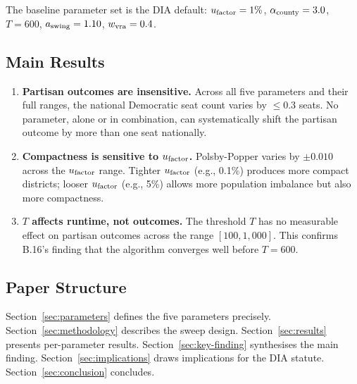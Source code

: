 The baseline parameter set is the DIA default: $u_{\mathrm{factor}} = 1\%$,
$\alpha_{\mathrm{county}} = 3.0$, $T = 600$, $a_{\mathrm{swing}} = 1.10$, $w_{\mathrm{vra}} = 0.4$.

\subsection{Main Results}

\begin{enumerate}
\item \textbf{Partisan outcomes are insensitive.}
      Across all five parameters and their full ranges, the national
      Democratic seat count varies by $\leq 0.3$ seats.
      No parameter, alone or in combination, can systematically shift the
      partisan outcome by more than one seat nationally.
\item \textbf{Compactness is sensitive to $u_{\mathrm{factor}}$.}
      Polsby-Popper varies by $\pm 0.010$ across the $u_{\mathrm{factor}}$ range.
      Tighter $u_{\mathrm{factor}}$ (e.g., 0.1\%) produces more compact districts;
      looser $u_{\mathrm{factor}}$ (e.g., 5\%) allows more population imbalance
      but also more compactness.
\item \textbf{$T$ affects runtime, not outcomes.}
      The \cs{} threshold $T$ has no measurable effect on partisan
      outcomes across the range $[100, 1{,}000]$.
      This confirms B.16's finding that the algorithm converges well
      before $T = 600$.
\end{enumerate}

\subsection{Paper Structure}

Section~\ref{sec:parameters} defines the five parameters precisely.
Section~\ref{sec:methodology} describes the sweep design.
Section~\ref{sec:results} presents per-parameter results.
Section~\ref{sec:key-finding} synthesises the main finding.
Section~\ref{sec:implications} draws implications for the DIA statute.
Section~\ref{sec:conclusion} concludes.
